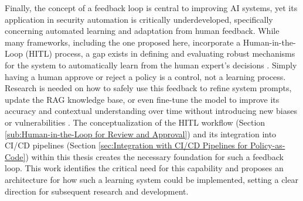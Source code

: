 Finally, the concept of a feedback loop is central to improving AI systems, yet its application in security automation is critically underdeveloped, specifically concerning automated learning and adaptation from human feedback. While many frameworks, including the one proposed here, incorporate a Human-in-the-Loop (HITL) process, a gap exists in defining and evaluating robust mechanisms for the system to automatically learn from the human expert’s decisions \cite{nicosia_6_2024,noauthor_human---loop_nodate}. Simply having a human approve or reject a policy is a control, not a learning process. Research is needed on how to safely use this feedback to refine system prompts, update the RAG knowledge base, or even fine-tune the model to improve its accuracy and contextual understanding over time without introducing new biases or vulnerabilities \cite{tabassi_artificial_2023-1,surathunmanun_exploring_2024-1}. The conceptualization of the HITL workflow (Section \ref{sub:Human-in-the-Loop for Review and Approval}) and its integration into CI/CD pipelines (Section \ref{sec:Integration with CI/CD Pipelines for Policy-as-Code}) within this thesis creates the necessary foundation for such a feedback loop. This work identifies the critical need for this capability and proposes an architecture for how such a learning system could be implemented, setting a clear direction for subsequent research and development.


